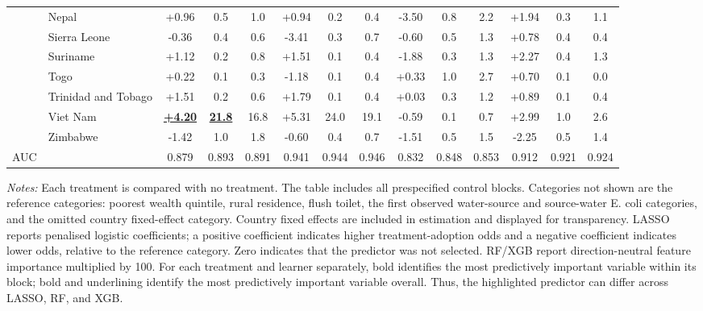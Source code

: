 \begin{landscape}
\begin{table}[p]
\begin{adjustbox}{max width=\textwidth,center}
\begin{tabular}{ll*{12}{c}}
 & Nepal & +0.96 & 0.5 & 1.0 & +0.94 & 0.2 & 0.4 & -3.50 & 0.8 & 2.2 & +1.94 & 0.3 & 1.1 \\
 & Sierra Leone & -0.36 & 0.4 & 0.6 & -3.41 & 0.3 & 0.7 & -0.60 & 0.5 & 1.3 & +0.78 & 0.4 & 0.4 \\
 & Suriname & +1.12 & 0.2 & 0.8 & +1.51 & 0.1 & 0.4 & -1.88 & 0.3 & 1.3 & +2.27 & 0.4 & 1.3 \\
 & Togo & +0.22 & 0.1 & 0.3 & -1.18 & 0.1 & 0.4 & +0.33 & 1.0 & 2.7 & +0.70 & 0.1 & 0.0 \\
 & Trinidad and Tobago & +1.51 & 0.2 & 0.6 & +1.79 & 0.1 & 0.4 & +0.03 & 0.3 & 1.2 & +0.89 & 0.1 & 0.4 \\
 & Viet Nam & \textbf{\underline{+4.20}} & \textbf{\underline{21.8}} & 16.8 & +5.31 & 24.0 & 19.1 & -0.59 & 0.1 & 0.7 & +2.99 & 1.0 & 2.6 \\
 & Zimbabwe & -1.42 & 1.0 & 1.8 & -0.60 & 0.4 & 0.7 & -1.51 & 0.5 & 1.5 & -2.25 & 0.5 & 1.4 \\
\midrule
AUC & & 0.879 & 0.893 & 0.891 & 0.941 & 0.944 & 0.946 & 0.832 & 0.848 & 0.853 & 0.912 & 0.921 & 0.924 \\
\bottomrule
\end{tabular}
\end{adjustbox}
\par\vspace{3pt}
\begin{minipage}{\linewidth}\footnotesize \textit{Notes:} Each treatment is compared with no treatment. The table includes all prespecified control blocks. Categories not shown are the reference categories: poorest wealth quintile, rural residence, flush toilet, the first observed water-source and source-water E. coli categories, and the omitted country fixed-effect category. Country fixed effects are included in estimation and displayed for transparency. LASSO reports penalised logistic coefficients; a positive coefficient indicates higher treatment-adoption odds and a negative coefficient indicates lower odds, relative to the reference category. Zero indicates that the predictor was not selected. RF/XGB report direction-neutral feature importance multiplied by 100. For each treatment and learner separately, bold identifies the most predictively important variable within its block; bold and underlining identify the most predictively important variable overall. Thus, the highlighted predictor can differ across LASSO, RF, and XGB.\end{minipage}
\end{table}
\end{landscape}
